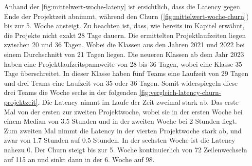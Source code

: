 Anhand der \autoref{fig:mittelwert-woche-lateny} ist ersichtlich, dass die Latency gegen Ende der Projektzeit abnimmt, während den Churn (\autoref{fig:mittelwert-woche-churn}) bis zur 5. Woche ansteigt. 
Zu beachten ist, dass, wie bereits im Kapitel  erwähnt, die Projekte nicht exakt 28 Tage dauern. Die ermittelten Projektlaufzeiten liegen zwischen 20 und 36 Tagen.
Wobei die Klassen aus den Jahren 2021 und 2022 bei einem Durchschnitt von 21 Tagen liegen. Die neueren Klassen ab dem Jahr 2023 haben eine Projektlaufzeitspannweite von 28 bis 36 Tagen, wobei eine Klasse 35 Tage überschreitet. In dieser Klasse haben fünf Teams eine Laufzeit von 29 Tagen und drei Teams eine Laufzeit von 35 oder 36 Tagen. Somit widerspiegeln diese drei Teams die Woche sechs in der folgenden \autoref{fig:vergleich-latency-churn-projektzeit}. Die Latency nimmt im Laufe der Zeit zweimal stark ab. Das erste Mal von der ersten zur zweiten Projektwoche, wobei sie in der ersten Woche bei einem Median von 3.5 Stunden und in der zweiten Woche bei 2 Stunden liegt. Zum zweiten Mal nimmt die Latency in der vierten Projektwoche stark ab, und zwar von 1.7 Stunden auf 0.5 Stunden. In der sechsten Woche ist die Latency nahezu 0. Der Churn steigt bis zur 5. Woche kontinuierlich von 72 Zeilenwechseln auf 115 an und sinkt dann in der 6. Woche auf 98.
